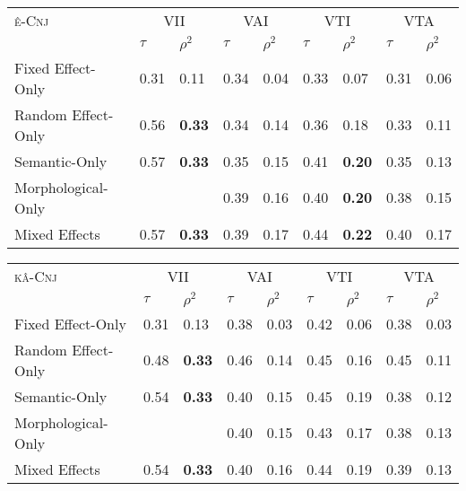 \begin{table*}
\begin{minipage}[t]{\columnwidth}
\caption{Model Comparisson. Conjunct Type Alternation, ê-Conjunct outcome} \label{tab:modcompcnjtype}
\centering 
        \begin{tabular}{lllllllll}
            \toprule
        \textsc{ê-Cnj}    & \multicolumn{2}{c}{VII}                          & \multicolumn{2}{c}{VAI}                          & \multicolumn{2}{c}{VTI}          & \multicolumn{2}{c}{VTA}                         \\
            & $\tau$      &$\rho^{2}$      & $\tau$      &$\rho^{2}$ & $\tau$           &$\rho^{2}$      & $\tau$      &$\rho^{2}$ \\
            \midrule
            Fixed Effect-Only  & 0.31 & 0.11 & 0.34 & 0.04 & 0.33 & 0.07 & 0.31 & 0.06   \\    
            Random Effect-Only & 0.56 & \textbf{0.33} & 0.34 & 0.14 & 0.36 & 0.18 & 0.33 & 0.11  \\    
            Semantic-Only      & 0.57 & \textbf{0.33} & 0.35 & 0.15 & 0.41 & \textbf{0.20} & 0.35 & 0.13  \\
            Morphological-Only &  &  & 0.39 & 0.16 & 0.40 & \textbf{0.20} & 0.38 & 0.15 \\
            Mixed Effects      & 0.57 & \textbf{0.33} & 0.39 & 0.17 & 0.44 & \textbf{0.22} & 0.40 & 0.17 \\
        
            \bottomrule
            \end{tabular}
\end{minipage}\hfill
\begin{minipage}[t]{\columnwidth}
\centering 
        \begin{tabular}{lllllllll}
            \toprule
        \textsc{kâ-Cnj}    & \multicolumn{2}{c}{VII}                          & \multicolumn{2}{c}{VAI}                          & \multicolumn{2}{c}{VTI}          & \multicolumn{2}{c}{VTA}                         \\
            & $\tau$      &$\rho^{2}$      & $\tau$      &$\rho^{2}$ & $\tau$           &$\rho^{2}$      & $\tau$      &$\rho^{2}$ \\
            \midrule
            Fixed Effect-Only  & 0.31 & 0.13 & 0.38 & 0.03 & 0.42 & 0.06 & 0.38 & 0.03   \\    
            Random Effect-Only & 0.48 & \textbf{0.33} & 0.46 & 0.14 & 0.45 & 0.16 & 0.45 & 0.11  \\    
            Semantic-Only      & 0.54 & \textbf{0.33} & 0.40 & 0.15 & 0.45 & 0.19 & 0.38 & 0.12  \\
            Morphological-Only &  &  & 0.40 & 0.15 & 0.43 & 0.17 & 0.38 & 0.13 \\
            Mixed Effects      & 0.54 & \textbf{0.33} & 0.40 & 0.16 & 0.44 & 0.19 & 0.39 & 0.13 \\
        

\end{tabular}
\end{minipage}
\end{table*}
